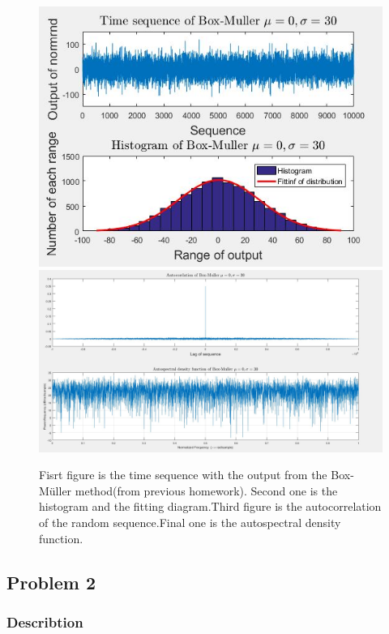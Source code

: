 \documentclass[12pt,a4paper]{article}
\begin{document}
	\begin{figure}[H]
		\begin{center}
			\includegraphics[scale=0.5]{Problem1b}
			\includegraphics[scale=0.4]{Problem1b2}
		\end{center}
		\caption[Properties of the Gaussian white process generated by the Box-M\"{u}ller method]{Fisrt figure is the time sequence with the output from the Box-M\"{u}ller method(from previous homework). Second one is the histogram and the fitting diagram.Third figure is the autocorrelation of the random sequence.Final one is the autospectral density function.}
	\end{figure}
	\subsection{Problem 2}
		\subsubsection{Describtion}
\end{document}
